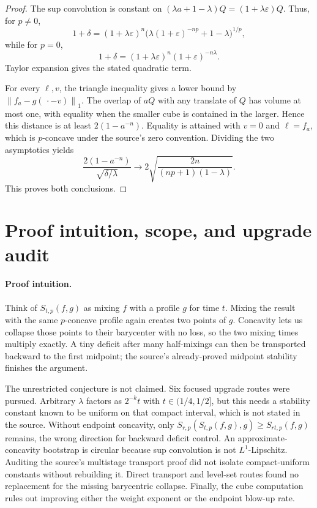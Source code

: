 \documentclass[11pt]{article}
\theoremstyle{remark}
\newcommand{\norm}[1]{\left\lVert#1\right\rVert_{1}}
\begin{document}
\begin{proof}
The sup convolution is constant on
$(\lambda a+1-\lambda)Q=(1+\lambda\varepsilon)Q$.  Thus, for $p\ne0$,
\[
 1+\delta=(1+\lambda\varepsilon)^n
 \bigl(\lambda(1+\varepsilon)^{-np}+1-\lambda\bigr)^{1/p},
\]
while for $p=0$,
\[
 1+\delta=(1+\lambda\varepsilon)^n(1+\varepsilon)^{-n\lambda}.
\]
Taylor expansion gives the stated quadratic term.

For every $\ell,v$, the triangle inequality gives a lower bound by
$\norm{f_a-g(\,\cdot-v)}$.  The overlap of $aQ$ with any translate of $Q$
has volume at most one, with equality when the smaller cube is contained in
the larger.  Hence this distance is at least $2(1-a^{-n})$.  Equality is
attained with $v=0$ and $\ell=f_a$, which is $p$-concave under the source's
zero convention.  Dividing the two asymptotics yields
\[
 \frac{2(1-a^{-n})}{\sqrt{\delta/\lambda}}
 \longrightarrow
 2\sqrt{\frac{2n}{(np+1)(1-\lambda)}}.
\]
This proves both conclusions.
\end{proof}

\section{Proof intuition, scope, and upgrade audit}

\paragraph{Proof intuition.}
Think of $S_{t,p}(f,g)$ as mixing $f$ with a profile $g$ for time $t$.
Mixing the result with the same $p$-concave profile again creates two points
of $g$.  Concavity lets us collapse those points to their barycenter with no
loss, so the two mixing times multiply exactly.  A tiny deficit after many
half-mixings can then be transported backward to the first midpoint; the
source's already-proved midpoint stability finishes the argument.

The unrestricted conjecture is not claimed.  Six focused upgrade routes
were pursued.  Arbitrary $\lambda$ factors as $2^{-k}t$ with
$t\in(1/4,1/2]$, but this needs a stability constant known to be uniform on
that compact interval, which is not stated in the source.  Without endpoint
concavity, only
$S_{r,p}(S_{t,p}(f,g),g)\geq S_{rt,p}(f,g)$ remains, the wrong direction for
backward deficit control.  An approximate-concavity bootstrap is circular
because sup convolution is not $L^1$-Lipschitz.  Auditing the source's
multistage transport proof did not isolate compact-uniform constants without
rebuilding it.  Direct transport and level-set routes found no replacement
for the missing barycentric collapse.  Finally, the cube computation rules
out improving either the weight exponent or the endpoint blow-up rate.
\end{document}
